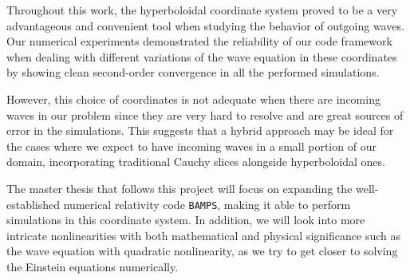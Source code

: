 Throughout this work, the hyperboloidal coordinate system proved to be a very advantageous and convenient tool when studying the behavior of outgoing waves. Our numerical experiments demonstrated the reliability of our code framework when dealing with different variations of the wave equation in these coordinates by showing clean second-order convergence in all the performed simulations.

However, this choice of coordinates is not adequate when there are incoming waves in our problem since they are very hard to resolve and are great sources of error in the simulations. This suggests that a hybrid approach may be ideal for the cases where we expect to have incoming waves in a small portion of our domain, incorporating traditional Cauchy slices alongside hyperboloidal ones.

The master thesis that follows this project will focus on expanding the well-established numerical relativity code \texttt{BAMPS}, making it able to perform simulations in this coordinate system. In addition, we will look into more intricate nonlinearities with both mathematical and physical significance such as the wave equation with quadratic nonlinearity, as we try to get closer to solving the Einstein equations numerically.